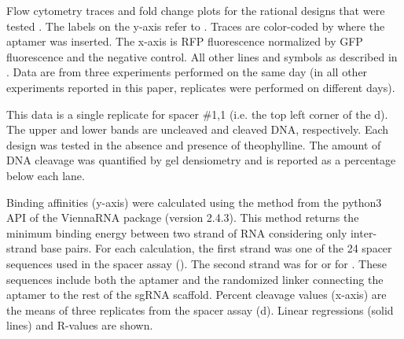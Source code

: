 \documentclass[10pt,oneside]{article}
\begin{document}


      Flow cytometry traces and fold change plots for the rational designs that were tested \invivo{}.  The labels on the y-axis refer to .  Traces are color-coded by where the aptamer was inserted.  The x-axis is RFP fluorescence normalized by GFP fluorescence and the negative control.  All other lines and symbols as described in .  Data are from three experiments performed on the same day (in all other experiments reported in this paper, replicates were performed on different days).



      This data is a single replicate for spacer \#1,1 (i.e. the top left corner of the d).  The upper and lower bands are uncleaved and cleaved DNA, respectively.  Each design was tested in the absence and presence of theophylline.  The amount of DNA cleavage was quantified by gel densiometry and is reported as a percentage below each lane.



     Binding affinities (y-axis) were calculated using the  method from the python3 API of the ViennaRNA package (version 2.4.3).  This method returns the minimum binding energy between two strand of RNA considering only inter-strand base pairs.  For each calculation, the first strand was one of the 24  spacer sequences used in the \invitro{} spacer assay ().  The second strand was  for \ligrnaF{} or  for \ligrnaB{}.  These sequences include both the aptamer and the randomized linker connecting the aptamer to the rest of the sgRNA scaffold.  Percent cleavage values (x-axis) are the means of three replicates from the \invitro{} spacer assay (d).  Linear regressions (solid lines) and R-values are shown.

\end{document}
